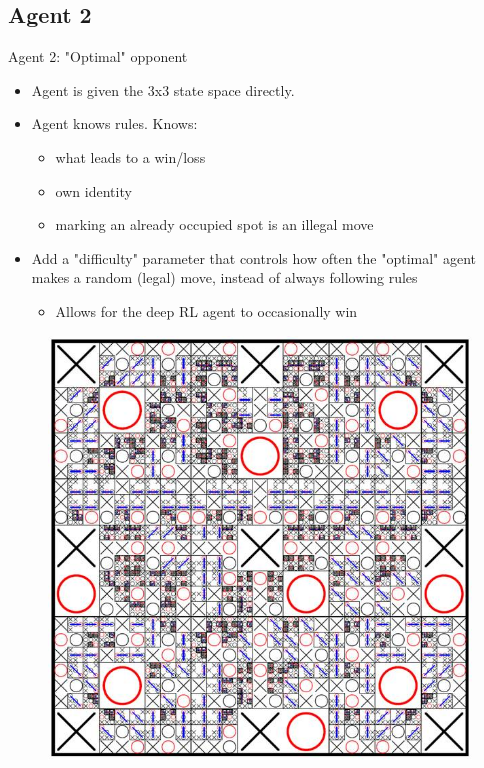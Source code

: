 \documentclass[11pt]{beamer}
\begin{document}
	\subsection{Agent 2}
	\begin{frame}{Agent 2: "Optimal" opponent}	
		\begin{minipage}[t]{0.55\linewidth}
			\begin{itemize}
				\item Agent is given the 3x3 state space directly.
				\item Agent knows rules. Knows:
				\begin{itemize}
					\item what leads to a win/loss
					\item own identity
					\item marking an already occupied spot is an illegal move
				\end{itemize}
				\item Add a "difficulty" parameter that controls how often the "optimal" agent makes a random (legal) move, instead of always following rules
				\begin{itemize}
					\item Allows for the deep RL agent to occasionally win
				\end{itemize}	
			\end{itemize}
		\end{minipage}
		\hfill
		\begin{minipage}[t]{0.4\linewidth}
			\centering
			\begin{figure}[tttAI]
				\centering
				\includegraphics[width=.95\textwidth]{Figures/tttAI.jpg}
			\end{figure}
		\end{minipage}
	\end{frame}
	
\end{document}
